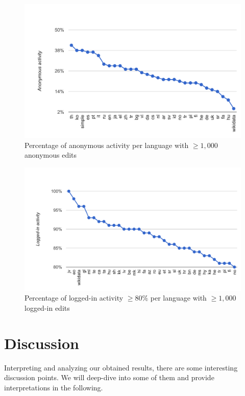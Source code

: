 \documentclass{sig-alternate}
\begin{document}
\begin{figure}[p]
  \center
  \includegraphics[width=\linewidth]{most-anonymous-edited-languages.pdf}
  \caption{Percentage of anonymous activity per language with $\geq1,000$ anonymous edits}
  \label{fig:most-anonymous-edited-languages}
\end{figure}

\begin{figure}[p]
  \center
  \includegraphics[width=\linewidth]{most-logged-in-edited-languages.pdf}
  \caption{Percentage of logged-in activity $\geq80\%$ per language with $\geq1,000$ logged-in edits}
  \label{fig:most-logged-in-edited-languages}
\end{figure}

\section{Discussion}

Interpreting and analyzing our obtained results,
there are some interesting discussion points.
We will deep-dive into some of them and provide interpretations
in the following.
\end{document}
